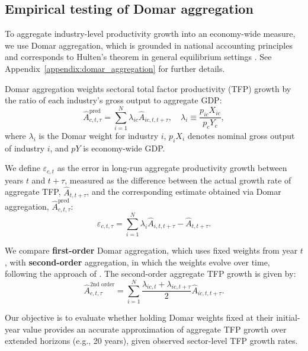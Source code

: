 \documentclass[11pt]{article}
\begin{document}
\subsection{Empirical testing of Domar aggregation}
\label{appendix:validation_Domar}

To aggregate industry-level productivity growth into an economy-wide measure, we use Domar aggregation, which is grounded in national accounting principles \citep{mcnerneyHowProductionNetworks2022, balk2021productivity} and corresponds to Hulten’s theorem in general equilibrium settings \citep{baqaeeMacroeconomicImpactMicroeconomic2019}. See Appendix~\ref{appendix:domar_aggregation} for further details.

Domar aggregation weights sectoral total factor productivity (TFP) growth by the ratio of each industry's gross output to aggregate GDP:
\begin{equation}
   \hat{A}_{c,t,\tau}^\text{pred} = \sum_{i=1}^N \lambda_{ic} \hat{A}_{ic,t,t+\tau}, \quad 
    \lambda_i \equiv \frac{p_{ic} X_{ic}}{p_cY_c},
\end{equation}
where \( \lambda_i \) is the Domar weight for industry \( i \), \( p_i X_i \) denotes nominal gross output of industry \( i \), and \( pY \) is economy-wide GDP.

We define $\varepsilon_{c,t}$ as the error in long-run aggregate productivity growth between years $t$ and $t+\tau$, measured as the difference between the actual growth rate of aggregate TFP, $\hat{A}_{t,t+\tau}$, and the corresponding estimate obtained via Domar aggregation, $\hat{A}_{c,t,\tau}^\text{pred}$:
\begin{equation}
    \varepsilon_{c,t,\tau} = \sum_{i=1}^N \lambda_i \hat{A}_{i,t,t+\tau} - \hat{A}_{t,t+\tau}.
\end{equation}

We compare \textbf{first-order} Domar aggregation, which uses fixed weights from year $t$, with \textbf{second-order} aggregation, in which the weights evolve over time, following the approach of \citet{baqaeeMacroeconomicImpactMicroeconomic2019}. The second-order aggregate TFP growth is given by:
\begin{equation}
   \hat{A}_{c,t,\tau}^\text{2nd~order} = \sum_{i=1}^N \frac{\lambda_{ic,t} + \lambda_{ic,t+\tau}}{2} \hat{A}_{ic,t,t+\tau}.
\end{equation}

Our objective is to evaluate whether holding Domar weights fixed at their initial-year value provides an accurate approximation of aggregate TFP growth over extended horizons (e.g., 20 years), given observed sector-level TFP growth rates.
\end{document}

